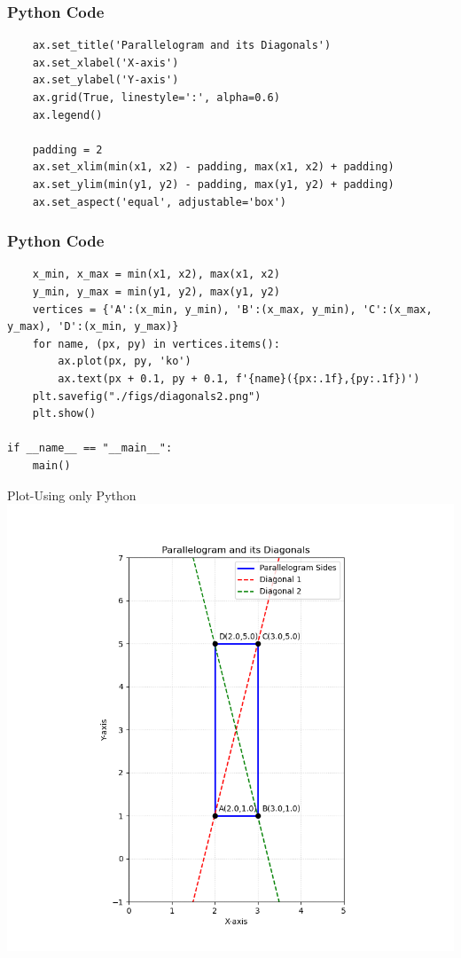 \documentclass{beamer}
\begin{document}
\begin{frame}[fragile]
    \frametitle{Python Code}
    \begin{lstlisting}
    ax.set_title('Parallelogram and its Diagonals')
    ax.set_xlabel('X-axis')
    ax.set_ylabel('Y-axis')
    ax.grid(True, linestyle=':', alpha=0.6)
    ax.legend()
    
    padding = 2
    ax.set_xlim(min(x1, x2) - padding, max(x1, x2) + padding)
    ax.set_ylim(min(y1, y2) - padding, max(y1, y2) + padding)
    ax.set_aspect('equal', adjustable='box')
\end{lstlisting}
\end{frame}
\begin{frame}[fragile]
    \frametitle{Python Code}
    \begin{lstlisting}
    x_min, x_max = min(x1, x2), max(x1, x2)
    y_min, y_max = min(y1, y2), max(y1, y2)
    vertices = {'A':(x_min, y_min), 'B':(x_max, y_min), 'C':(x_max, y_max), 'D':(x_min, y_max)}
    for name, (px, py) in vertices.items():
        ax.plot(px, py, 'ko')
        ax.text(px + 0.1, py + 0.1, f'{name}({px:.1f},{py:.1f})')
    plt.savefig("./figs/diagonals2.png") 
    plt.show()

if __name__ == "__main__":
    main()

\end{lstlisting}
\end{frame}


\begin{frame}{Plot-Using only Python}
    \centering
    \includegraphics[width=\columnwidth, height=0.8\textheight, keepaspectratio]{figs/diagonals2.png}     
\end{frame}
\end{document}

